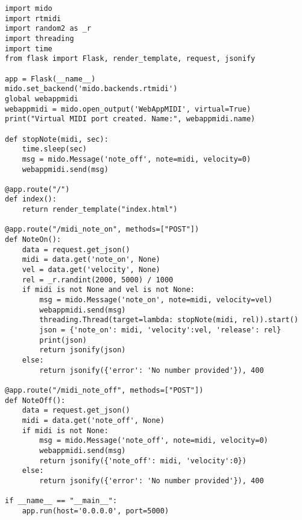 \documentclass[../main.tex]{subfiles}
\begin{document}
\begin{verbatim}
import mido
import rtmidi
import random2 as _r
import threading
import time
from flask import Flask, render_template, request, jsonify

app = Flask(__name__)
mido.set_backend('mido.backends.rtmidi')
global webappmidi
webappmidi = mido.open_output('WebAppMIDI', virtual=True)
print("Virtual MIDI port created. Name:", webappmidi.name)

def stopNote(midi, sec):
    time.sleep(sec)
    msg = mido.Message('note_off', note=midi, velocity=0)
    webappmidi.send(msg)

@app.route("/")
def index():
    return render_template("index.html")

@app.route("/midi_note_on", methods=["POST"])
def NoteOn():
    data = request.get_json()
    midi = data.get('note_on', None)
    vel = data.get('velocity', None)
    rel = _r.randint(2000, 5000) / 1000
    if midi is not None and vel is not None:
        msg = mido.Message('note_on', note=midi, velocity=vel)
        webappmidi.send(msg)
        threading.Thread(target=lambda: stopNote(midi, rel)).start()
        json = {'note_on': midi, 'velocity':vel, 'release': rel}
        print(json)
        return jsonify(json)
    else:
        return jsonify({'error': 'No number provided'}), 400
    
@app.route("/midi_note_off", methods=["POST"])
def NoteOff():
    data = request.get_json()
    midi = data.get('note_off', None)
    if midi is not None:
        msg = mido.Message('note_off', note=midi, velocity=0)
        webappmidi.send(msg)
        return jsonify({'note_off': midi, 'velocity':0})
    else:
        return jsonify({'error': 'No number provided'}), 400

if __name__ == "__main__":
    app.run(host='0.0.0.0', port=5000)
\end{verbatim}
\end{document}
